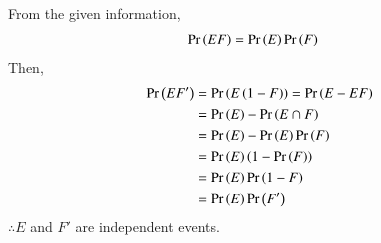 From the given information, 
	\begin{align}
	\Pr\left(E F\right) &= \Pr\left(E\right)  \Pr\left(F\right) 
\label{eq:2.1.23_ind}
	\end{align}
Then,
	\begin{align}		
	\Pr\left(E F'\right) &= \Pr\left(E\left(1-F\right)\right) = \Pr\left(E -EF\right)
\\
&=\Pr\left(E\right)  - \Pr\left(E\cap F\right) 
\\
&= \Pr\left(E\right)-\Pr\left(E\right)\Pr\left(F\right)
\\
&=\Pr\left(E\right) \left(1 - \Pr\left(F\right) \right)\\
 &= \Pr\left(E\right) \Pr\left(1-F\right)
\\
 &= \Pr\left(E\right) \Pr\left(F'\right)
	\end{align}
	$\therefore E$ and $F'$ are independent events.
	



\begin{comment}
	\begin{lstlisting}
	./codes/quadrilateral/q3.py
	\end{lstlisting}
	
	\solution The area is given as
	\begin{align}
	\frac{1}{2}\norm{\myvec{3\\1\\4}\times\myvec{1\\-1\\1}}
	\end{align}
	which is calculated and found as 3.24
	\end{comment}
